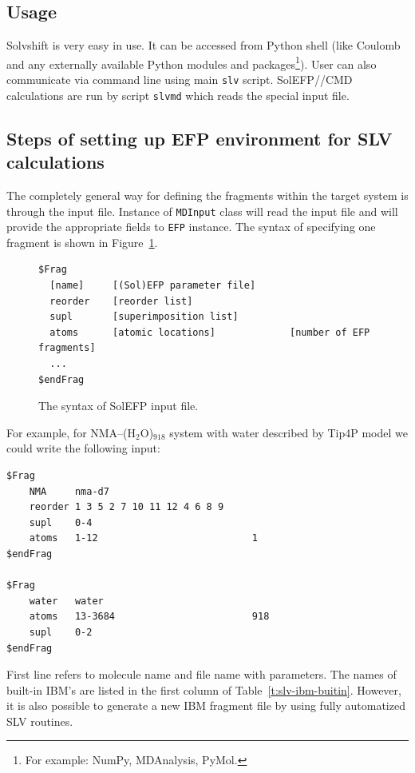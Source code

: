 \documentclass[a4paper,titlepage,twoside,fleqn,12pt]{book}
\begin{document}
\begin{refsection}
\section{Usage}

Solvshift is very easy in use. It can be accessed 
from Python shell (like {\sc Coulomb} and any externally
available Python modules and packages\footnote{For example: NumPy, MDAnalysis, PyMol.}).
User can also communicate via command line using main {\tt slv} script.
SolEFP//CMD calculations are run by script {\tt slv{\textunderscore}md} which reads the
special input file.

\subsection{Steps of setting up EFP environment for SLV calculations}

The completely general way for defining the fragments within the target system
is through the input file. 
Instance of {\tt MDInput} class
will read the input file and will provide the appropriate fields to {\tt EFP} instance. 
The syntax of specifying one fragment
is shown in Figure~\ref{f:slv-inp-file-syntax}.
%
\begin{figure}[t!]
\centering
\setlength\fboxsep{0.4pt}
\setlength\fboxrule{0.5pt}
\begin{verbatim}
$Frag
  [name]     [(Sol)EFP parameter file]
  reorder    [reorder list]
  supl       [superimposition list]
  atoms      [atomic locations]             [number of EFP fragments]
  ...
$endFrag
\end{verbatim}
\caption{
The syntax of SolEFP input file.
\label{f:slv-inp-file-syntax}}
\end{figure}
%
For example, for NMA--(H$_2$O)$_{918}$ system 
with water described by Tip4P model we could 
write the following input:
%
\begin{verbatim}
$Frag
    NMA     nma-d7
    reorder 1 3 5 2 7 10 11 12 4 6 8 9
    supl    0-4
    atoms   1-12                           1
$endFrag

$Frag
    water   water
    atoms   13­-3684                        918
    supl    0-2
$endFrag
\end{verbatim}
%
First line refers to molecule name and file name with parameters. 
The names of built-in IBM's are listed in the first column
of Table~\ref{t:slv-ibm-buitin}.
However, it is also possible to generate a new IBM fragment file
by using fully automatized SLV routines.


\end{refsection}
\end{document}
